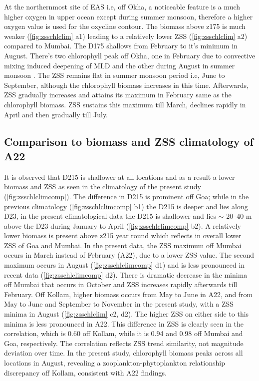 \documentclass{article}
\begin{document}
	At the northernmost site of EAS i.e, off Okha, a noticeable feature is a much higher oxygen in upper ocean except during summer monsoon, therefore  a higher oxygen value is used for the oxycline contour. The biomass above z175 is much weaker (\cref{fig:zsschlclim} a1) leading to a relatively lower ZSS (\cref{fig:zsschlclim} a2) compared to Mumbai. The D175 shallows from February to it's minimum in August. There's two chlorophyll peak off Okha, one in February due to convective mixing induced deepening of MLD \citep{wiggert2005monsoon,levy2007basin,keerthi2017physical,shankar2016inhibition} and the other during August in summer monsoon \citep{wiggert2005monsoon,levy2007basin}. The ZSS remains flat in summer monsoon period i.e, June to September, although the chlorophyll biomass increases in this time. Afterwards, ZSS gradually increases and attains its maximum in February same as the chlorophyll biomass. ZSS sustains this maximum till March, declines rapidly in April and then gradually till July.
	 
	\subsection{Comparison to biomass and ZSS climatology of A22}	 
	It is observed that D215 is shallower at all locations and as a result a lower biomass and ZSS as seen in the climatology of the present study (\cref{fig:zsschlclimcomp}). The difference in D215 is prominent off Goa; while in the previous climatology (\cref{fig:zsschlclimcomp} b1) the D215 is deeper and lies along D23, in the present climatological data the D215 is shallower and lies $\sim$ 20--40 m above the D23 during January to April  (\cref{fig:zsschlclimcomp} b2). A relatively lower biomass is present above z215 year round which reflects in overall lower ZSS of Goa and Mumbai. In the present data, the ZSS maximum off Mumbai occurs in March instead of February (A22), due to a lower ZSS value. The second maximum occurs in August (\cref{fig:zsschlclimcomp} d1) and is less pronounced in recent data (\cref{fig:zsschlclimcomp} d2). There is dramatic decrease in the minima off Mumbai that occurs in October and ZSS increases rapidly afterwards till February. Off Kollam, higher biomass occurs from May to June in A22, and from May to June and September to November in the present study, with a ZSS minima in August (\cref{fig:zsschlclim} c2, d2). The higher ZSS on either side to this minima is less pronounced in A22. This difference in ZSS is clearly seen in the correlation, which is 0.60 off Kollam, while it is 0.94 and 0.98 off Mumbai and Goa, respectively. The correlation reflects ZSS trend similarity, not magnitude deviation over time. In the present study, chlorophyll biomass peaks across all locations in August, revealing a zooplankton-phytoplankton relationship discrepancy off Kollam, consistent with A22 findings.
	
\end{document}
